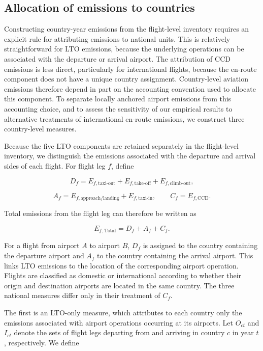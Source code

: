 \documentclass[12pt]{article}
\begin{document}
\subsection*{Allocation of emissions to countries}

Constructing country-year emissions from the flight-level inventory requires an explicit rule for attributing emissions to national units. This is relatively straightforward for LTO emissions, because the underlying operations can be associated with the departure or arrival airport. The attribution of CCD emissions is less direct, particularly for international flights, because the en-route component does not have a unique country assignment. Country-level aviation emissions therefore depend in part on the accounting convention used to allocate this component. To separate locally anchored airport emissions from this accounting choice, and to assess the sensitivity of our empirical results to alternative treatments of international en-route emissions, we construct three country-level measures.

Because the five LTO components are retained separately in the flight-level inventory, we distinguish the emissions associated with the departure and arrival sides of each flight. For flight leg $f$, define

\[
D_f
=
E_{f,\mathrm{taxi\mbox{-}out}}
+
E_{f,\mathrm{take\mbox{-}off}}
+
E_{f,\mathrm{climb\mbox{-}out}},
\]

\[
A_f
=
E_{f,\mathrm{approach/landing}}
+
E_{f,\mathrm{taxi\mbox{-}in}},
\qquad
C_f
=
E_{f,\mathrm{CCD}}.
\]

Total emissions from the flight leg can therefore be written as

\begin{equation}
E_{f,\mathrm{Total}}
=
D_f+A_f+C_f .
\label{eq:nature_4}
\end{equation}

For a flight from airport $A$ to airport $B$, $D_f$ is assigned to the country containing the departure airport and $A_f$ to the country containing the arrival airport. This links LTO emissions to the location of the corresponding airport operation. Flights are classified as domestic or international according to whether their origin and destination airports are located in the same country. The three national measures differ only in their treatment of $C_f$.

The first is an LTO-only measure, which attributes to each country only the emissions associated with airport operations occurring at its airports. Let $O_{ct}$ and $I_{ct}$ denote the sets of flight legs departing from and arriving in country $c$ in year $t$, respectively. We define
\end{document}
